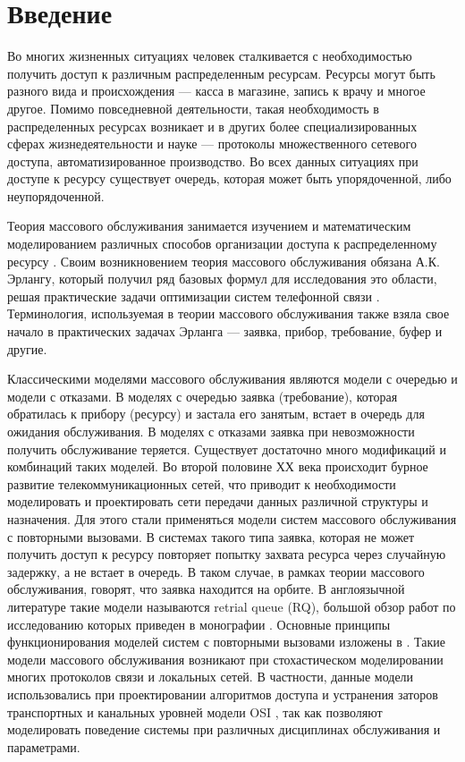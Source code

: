 \section* {Введение}%
Во многих жизненных ситуациях человек сталкивается с необходимостью получить доступ к различным распределенным ресурсам. Ресурсы могут быть разного вида и происхождения --- касса в магазине, запись к врачу и многое другое. Помимо повседневной деятельности, такая необходимость в распределенных ресурсах возникает и в других более специализированных сферах жизнедеятельности и науке --- протоколы множественного сетевого доступа, автоматизированное производство. Во всех данных ситуациях при доступе к ресурсу существует очередь, которая может быть упорядоченной, либо неупорядоченной.

Теория массового обслуживания занимается изучением и математическим моделированием различных способов организации доступа к распределенному ресурсу \cite{nazarov2010theory}. Своим возникновением теория массового обслуживания обязана А.К. Эрлангу, который получил ряд базовых формул для исследования это области, решая практические задачи оптимизации систем телефонной связи \cite{erlang1909theory}. Терминология, используемая в теории массового обслуживания также взяла свое начало в практических задачах Эрланга ---  заявка, прибор, требование, буфер и другие.

Классическими моделями массового обслуживания являются модели с очередью и модели с отказами. В моделях с очередью заявка (требование), которая обратилась к прибору (ресурсу) и застала его занятым, встает в очередь для ожидания обслуживания. В моделях с отказами заявка при невозможности получить обслуживание теряется. Существует достаточно много модификаций и комбинаций таких моделей. 
Во второй половине ХХ века происходит бурное развитие телекоммуникационных сетей, что приводит к необходимости моделировать и проектировать сети передачи данных различной структуры и назначения. Для этого стали применяться модели систем массового обслуживания с повторными вызовами. В системах такого типа заявка, которая не может получить доступ к ресурсу повторяет попытку захвата ресурса через случайную задержку, а не встает в очередь. В таком случае, в рамках теории массового обслуживания, говорят, что заявка находится на орбите. В англоязычной литературе такие модели называются retrial queue (RQ), большой обзор работ по исследованию которых приведен в монографии \cite{artalejo2010accessible}. Основные принципы функционирования моделей систем с повторными вызовами изложены в \cite{jesus2008retrial,falin1997retrial}. Такие модели массового обслуживания возникают при стохастическом моделировании многих протоколов связи и локальных сетей. В частности, данные модели использовались при проектировании алгоритмов доступа и устранения заторов транспортных и канальных уровней модели OSI \cite{bjornstad2006traffic,kritzinger1986performance,olypher2010computer}, так как позволяют моделировать поведение системы при различных дисциплинах обслуживания и параметрами.



